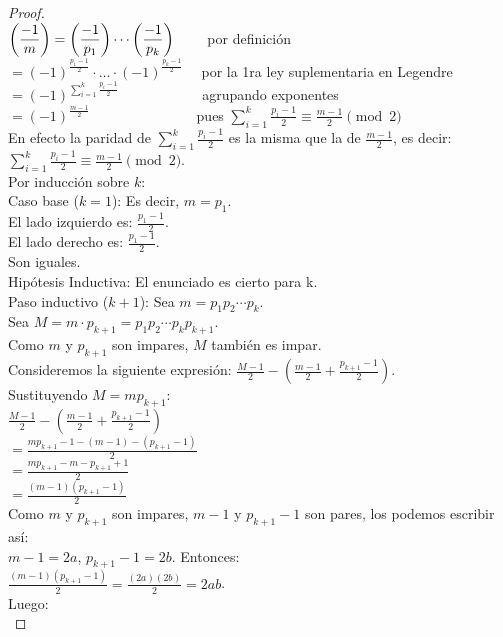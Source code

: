 \begin{proof} \, \\
$\left(\dfrac{-1}{m}\right) = \left(\dfrac{-1}{p_1}\right) \cdots \left(\dfrac{-1}{p_k}\right) \qquad$ por definición \\
$ = (-1)^{\frac{p_1 - 1}{2}} \cdot \ldots \cdot (-1)^{\frac{p_k - 1}{2}} \quad$ por la 1ra ley suplementaria en Legendre \\
$ = (-1)^{\sum_{i=1}^k \frac{p_i - 1}{2}} \qquad \qquad \quad \; \,\,$ agrupando exponentes \\
$ = (-1)^{\frac{m-1}{2}} \qquad \qquad \qquad \quad \;$ pues $\sum_{i=1}^k \frac{p_i - 1}{2} \equiv \frac{m-1}{2} \pmod{2}$ \\
En efecto la paridad de $\sum_{i=1}^k \frac{p_i - 1}{2}$ es la misma que la de $\frac{m-1}{2}$, es decir: \\
$\sum_{i=1}^k \frac{p_i - 1}{2} \equiv \frac{m-1}{2} \pmod{2}$. \\
Por inducción sobre $k$: \\
Caso base ($k=1$): Es decir, $m=p_1$. \\
El lado izquierdo es: $\frac{p_1 - 1}{2}$. \\
El lado derecho es: $\frac{p_1-1}{2}$. \\
Son iguales. \\
Hipótesis Inductiva: El enunciado es cierto para k.\\
Paso inductivo ($k+1$): Sea $m=p_1p_2\cdots p_k$. \\
Sea $M=m\cdot p_{k+1}=p_1p_2\cdots p_kp_{k+1}$. \\
Como $m$ y $p_{k+1}$ son impares, $M$ también es impar. \\
Consideremos la siguiente expresión: $\frac{M-1}{2}-\left(\frac{m-1}{2}+\frac{p_{k+1}-1}{2}\right)$. \\
Sustituyendo $M=mp_{k+1}$: \\
$\frac{M-1}{2}-\left(\frac{m-1}{2}+\frac{p_{k+1}-1}{2}\right)$ \\
$=\frac{mp_{k+1}-1-(m-1)-(p_{k+1}-1)}{2}$ \\
$=\frac{mp_{k+1}-m-p_{k+1}+1}{2}$ \\
$=\frac{(m-1)(p_{k+1}-1)}{2}$ \\
Como $m$ y $p_{k+1}$ son impares, $m-1$ y $p_{k+1}-1$ son pares, los podemos escribir así: \\
$m-1=2a$, $p_{k+1}-1=2b$. Entonces: \\ 
$\frac{(m-1)(p_{k+1}-1)}{2} =\frac{(2a)(2b)}{2}=2ab$. \\
Luego: \\

\end{proof}
